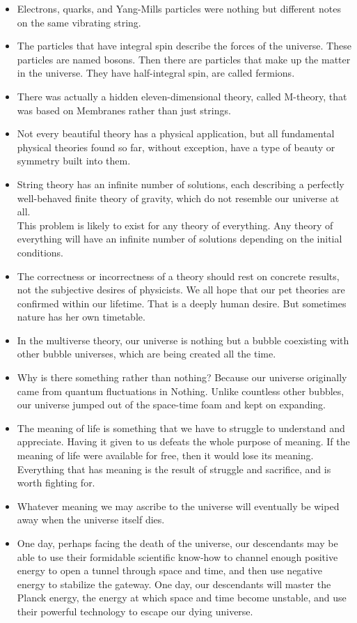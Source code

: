 \documentclass[UTF8]{ctexart}
\begin{document}
\begin{itemize}
			\item Electrons, quarks, and Yang-Mills particles were nothing but different notes on the same vibrating string.
			\item The particles that have integral spin describe the forces of the universe. These particles are named bosons. Then there are particles that make up the matter in the universe. They have half-integral spin, are called fermions.
			\item There was actually a hidden eleven-dimensional theory, called M-theory, that was based on Membranes rather than just strings. 
			\item Not every beautiful theory has a physical application, but all fundamental physical theories found so far, without exception, have a type of beauty or symmetry built into them.
			\item String theory has an infinite number of solutions, each describing a perfectly well-behaved finite theory of gravity, which do not resemble our universe at all. \\
			This problem is likely to exist for any theory of everything. Any theory of everything will have an infinite number of solutions depending on the initial conditions.
			\item The correctness or incorrectness of a theory should rest on concrete results, not the subjective desires of physicists. We all hope that our pet theories are confirmed within our lifetime. That is a deeply human desire. But sometimes nature has her own timetable.
			\item In the multiverse theory, our universe is nothing but a bubble coexisting with other bubble universes, which are being created all the time.
			\item Why is there something rather than nothing? Because our universe originally came from quantum fluctuations in Nothing. Unlike countless other bubbles, our universe jumped out of the space-time foam and kept on expanding.
			\item The meaning of life is something that we have to struggle to understand and appreciate. Having it given to us defeats the whole purpose of meaning. If the meaning of life were available for free, then it would lose its meaning. Everything that has meaning is the result of struggle and sacrifice, and is worth fighting for.
			\item Whatever meaning we may ascribe to the universe will eventually be wiped away when the universe itself dies.
			\item One day, perhaps facing the death of the universe, our descendants may be able to use their formidable scientific know-how to channel enough positive energy to open a tunnel through space and time, and then use negative energy to stabilize the gateway. One day, our descendants will master the Planck energy, the energy at which space and time become unstable, and use their powerful technology to escape our dying universe.
		\end{itemize} 
	
\end{document}
